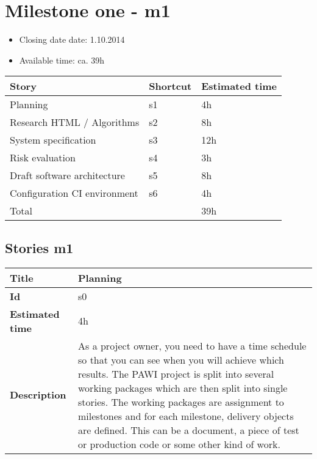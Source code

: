 \section{Milestone one - m1}

\begin{itemize}
\item Closing date date: 1.10.2014
\item Available time: ca. 39h
\end{itemize}

    \begin{tabular}{ | p{10cm} | p{2cm} | p{2cm} |}
    \hline
    \textbf{Story} & \textbf{Shortcut}& \textbf{Estimated time} \\ \hline
    Planning & s1 &4h \\
    Research HTML / Algorithms & s2 & 8h \\
    System specification & s3 & 12h \\
    Risk evaluation & s4 & 3h\\
    Draft software architecture & s5 & 8h \\ 
    Configuration CI environment & s6 & 4h \\ \hline
    Total & & 39h\\
    \hline
    \end{tabular}

\subsection {Stories m1}

    \begin{tabular}{ | p{4cm} | p{10cm} |}
    \hline
    \textbf{Title} & Planning\\ \hline
    \textbf{Id} & s0\\ \hline
    \textbf{Estimated time} & 4h \\ \hline
    \textbf{Description} &  As a project owner, you need to have a time schedule so that you can see when you will achieve which results. The PAWI project is split into several working packages which are then split into single stories. The working packages are assignment to milestones and for each milestone, delivery objects are defined. This can be a document, a piece of test or production code or some other kind of work.\\
    \hline
    \end{tabular} \\\\

